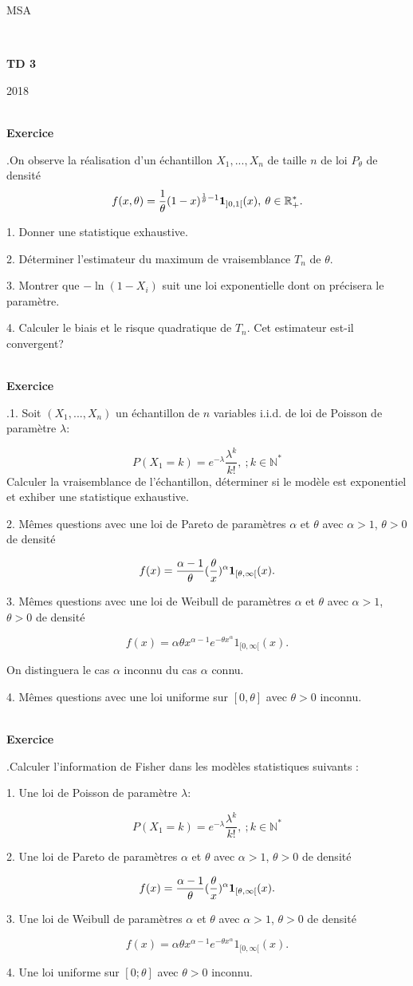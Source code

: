 \documentclass[11pt,a4paper]{article}
\newcommand{\R}{\mathbb{R}}\newcommand{\C}{\mathbb{C}}
\newcommand{\N}{\mathbb{N}}\newcommand{\Q}{\mathbb{Q}}
\def \N{\mathbb{N}}
\def \R{\mathbb{R}}
\def \Q{\mathbb{Q}}
\newcounter{exo}
\def\exo{\mbox{}\\[0em]\hspace*{0em}\bf Exercice
\addtocounter{exo}{1}\arabic{exo}.\rm\hspace{1ex}}
\begin{document}
\centerline{\sc MSA}  \centerline{~}
\vskip1cm \centerline{{\bf TD 3}} \centerline{2018}


\exo On observe la r\'ealisation d'un \'echantillon $X_1,...,X_n$
de taille $n$ de loi $P_{\theta}$ de densit\'e $$ f(x, \theta) =
\frac{1}{\theta} (1 -x )^{\frac{1}{\theta} - 1} {\bf 1}_{]0, 1[}
(x), \:\theta \in \R_+^*.$$

1. Donner une statistique exhaustive.

2. D\'eterminer l'estimateur du maximum de vraisemblance $T_n$ de
$\theta$.

3. Montrer que $-\ln(1 -X_i)$ suit une loi exponentielle dont on
pr\'ecisera le param\`etre.

4. Calculer le biais et le risque quadratique de $T_n$. Cet
estimateur est-il convergent?



\exo 1. Soit $(X_1,...,X_n)$ un \'echantillon de $n$ variables
i.i.d. de loi de Poisson de param\`etre $\lambda$:

$$P(X_1 = k) = e^{-\lambda} \frac{\lambda^k}{k!},\: ; k \in \N^*$$
Calculer la vraisemblance de l'\'echantillon, d\'eterminer si le
mod\`ele est exponentiel et exhiber une statistique exhaustive.

2. M\^emes questions avec une loi de Pareto de param\`etres
$\alpha$ et $\theta$ avec $\alpha > 1$, $\theta > 0$ de densit\'e

$$f(x) = \frac{\alpha -1}{\theta} (\frac{\theta}{x})^{\alpha} {\bf 1}_{[\theta,
\infty[}(x).$$

3. M\^emes questions avec une loi de Weibull de param\`etres
$\alpha$ et $\theta$ avec $\alpha > 1$, $\theta > 0$ de densit\'e

$$f(x) = \alpha \theta x^{\alpha -1} e^{- \theta x^{\alpha}} 1_{[0,
\infty[}(x).$$

On distinguera le cas $\alpha$ inconnu du cas $\alpha$ connu.

4. M\^emes questions avec une loi uniforme sur $[0, \theta]$ avec
$\theta > 0$ inconnu.


\exo Calculer l'information de Fisher dans les mod\`eles
statistiques suivants :

1. Une loi de Poisson de param\`etre $\lambda$:

$$P(X_1 = k) = e^{-\lambda} \frac{\lambda^k}{k!},\: ; k \in \N^*$$

2. Une loi de Pareto de param\`etres $\alpha$ et $\theta$ avec
$\alpha > 1$, $\theta > 0$ de densit\'e

$$f(x) = \frac{\alpha -1}{\theta} (\frac{\theta}{x})^{\alpha} {\bf 1}_{[\theta,
\infty[}(x).$$

3. Une loi de Weibull de param\`etres $\alpha$ et $\theta$ avec
$\alpha
> 1$, $\theta > 0$ de densit\'e

$$f(x) = \alpha \theta x^{\alpha -1} e^{- \theta x^{\alpha}} 1_{[0,
\infty[}(x).$$

4. Une loi uniforme sur $[0; \theta]$ avec $\theta > 0$ inconnu.
\end{document}

